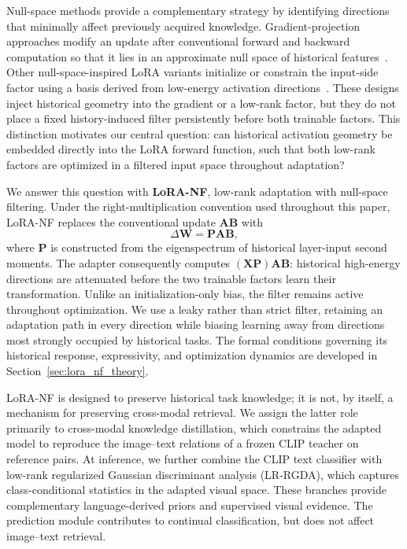 Null-space methods provide a complementary strategy by identifying directions that minimally affect previously acquired knowledge. Gradient-projection approaches modify an update after conventional forward and backward computation so that it lies in an approximate null space of historical features~\cite{saha2021gradient,kang2025dynamic}. Other null-space-inspired LoRA variants initialize or constrain the input-side factor using a basis derived from low-energy activation directions~\cite{tang2026lora}. These designs inject historical geometry into the gradient or a low-rank factor, but they do not place a fixed history-induced filter persistently before both trainable factors. This distinction motivates our central question: can historical activation geometry be embedded directly into the LoRA forward function, such that both low-rank factors are optimized in a filtered input space throughout adaptation?

We answer this question with \textbf{LoRA-NF}, low-rank adaptation with null-space filtering. Under the right-multiplication convention used throughout this paper, LoRA-NF replaces the conventional update $\mathbf{A}\mathbf{B}$ with
\begin{equation}
    \Delta\mathbf{W}=\mathbf{P}\mathbf{A}\mathbf{B},
    \label{eq:intro_lora_nf}
\end{equation}
where $\mathbf{P}$ is constructed from the eigenspectrum of historical layer-input second moments. The adapter consequently computes $(\mathbf{X}\mathbf{P})\mathbf{A}\mathbf{B}$: historical high-energy directions are attenuated before the two trainable factors learn their transformation. Unlike an initialization-only bias, the filter remains active throughout optimization. We use a leaky rather than strict filter, retaining an adaptation path in every direction while biasing learning away from directions most strongly occupied by historical tasks. The formal conditions governing its historical response, expressivity, and optimization dynamics are developed in Section~\ref{sec:lora_nf_theory}.

LoRA-NF is designed to preserve historical task knowledge; it is not, by itself, a mechanism for preserving cross-modal retrieval. We assign the latter role primarily to cross-modal knowledge distillation, which constrains the adapted model to reproduce the image--text relations of a frozen CLIP teacher on reference pairs. At inference, we further combine the CLIP text classifier with low-rank regularized Gaussian discriminant analysis (LR-RGDA), which captures class-conditional statistics in the adapted visual space. These branches provide complementary language-derived priors and supervised visual evidence. The prediction module contributes to continual classification, but does not affect image--text retrieval.

